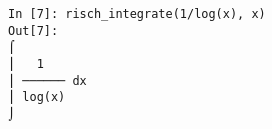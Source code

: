 ﻿\documentclass{article}
\begin{document}
\normalsize
\begin{Verbatim}
In [7]: risch_integrate(1/log(x), x)
Out[7]: 
⌠          
⎮   1      
⎮ ────── dx
⎮ log(x)   
⌡          
\end{Verbatim}
\end{document}
